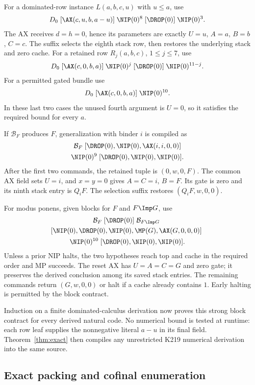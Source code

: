 For a dominated-row instance $L(a,b,c,u)$ with $u\leq a$, use
\[
 D_0\;[\AX(c,u,b,a-u)]\;\NIP(0)^8\;[\DROP(0)]\;\NIP(0)^3.
\]
The AX receives $d=h=0$, hence its parameters are exactly
$U=u$, $A=a$, $B=b$, $C=c$.  The suffix selects the eighth stack row,
then restores the underlying stack and zero cache.
For a retained row $R_j(a,b,c)$, $1\leq j\leq7$, use
\[
 D_0\;[\AX(c,0,b,a)]\;\NIP(0)^j\;[\DROP(0)]\;\NIP(0)^{11-j}.
\]
For a permitted gated bundle use
\[
 D_0\;[\AX(c,0,b,a)]\;\NIP(0)^{10}.
\]
In these last two cases the unused fourth argument is $U=0$, so it
satisfies the required bound for every $a$.

If $\mathcal B_F$ produces $F$, generalization with binder $i$ is compiled
as
\begin{multline*}
 \mathcal B_F\;[\DROP(0),\NIP(0),\AX(i,i,0,0)]\\
 {}\NIP(0)^9\;[\DROP(0),\NIP(0),\NIP(0)].
\end{multline*}
After the first two commands, the retained tuple is $(0,w,0,F)$.
The common AX field sets $U=i$, and $x=y=0$ gives $A=C=i$,
$B=F$.  Its gate is zero and its ninth stack entry is $Q_iF$.
The selection suffix restores $(Q_iF,w,0,0)$.

For modus ponens, given blocks for $F$ and $F\Imp G$, use
\begin{multline*}
 \mathcal B_F\;[\DROP(0)]\;\mathcal B_{F\Imp G}\;\\
 [\NIP(0),\DROP(0),\NIP(0),\MP(G),\AX(G,0,0,0)]\;\\
 \NIP(0)^{10}\;[\DROP(0),\NIP(0),\NIP(0)].
\end{multline*}
Unless a prior NIP halts, the two hypotheses reach top and cache in the
required order and MP succeeds.  The reset AX has $U=A=C=G$ and zero
gate; it preserves the derived conclusion among its saved stack entries.
The remaining commands return $(G,w,0,0)$ or halt if a cache already
contains $1$.  Early halting is permitted by the block contract.

Induction on a finite dominated-calculus derivation now proves this
strong block contract for every derived natural code.  No numerical
bound is tested at runtime: each row leaf supplies the nonnegative
literal $a-u$ in its final field.  Theorem~\ref{thm:exact} then compiles
any unrestricted K219 numerical derivation into the same source.

\subsection{Exact packing and cofinal enumeration}

